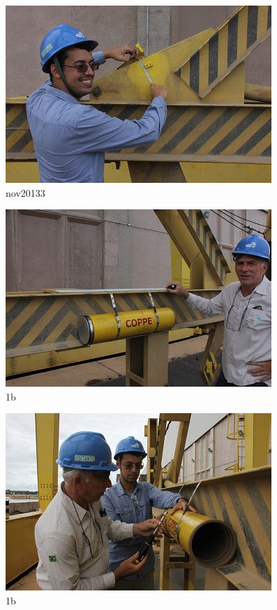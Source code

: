 \begin{figure}[h!]
  \centering
  \includegraphics[width=1\linewidth]{Fotos/Janeiro2015/3.jpg}
  \caption{nov20133}
  \label{nov20133}
\end{figure}

\begin{figure}[h!]
  \centering
  \includegraphics[width=1\linewidth]{Fotos/Janeiro2015/4.jpg}
  \caption{1b}
  \label{nov20134}
\end{figure}

\begin{figure}[h!]
  \centering
  \includegraphics[width=1\linewidth]{Fotos/Janeiro2015/5.jpg}
  \caption{1b}
  \label{nov20134}
\end{figure}

